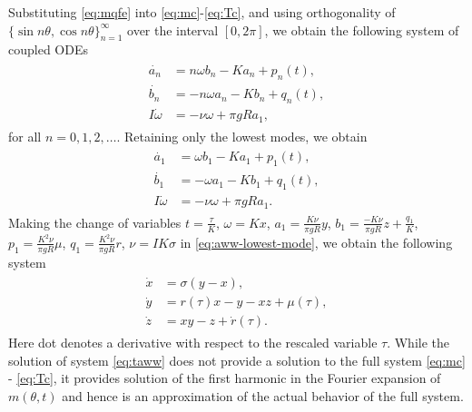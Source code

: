 Substituting \eqref{eq:mqfe} into \eqref{eq:mc}-\eqref{eq:Tc}, and using orthogonality of 
$\{\sin n\theta, \cos n\theta \}_{n=1}^\infty$ over the interval $[0,2\pi]$, we 
obtain the following system of coupled ODEs
\begin{align} \label{eq:aww-all-modes}
\begin{split}
\dot{a_n} &= n \omega b_n - Ka_n + p_n(t), \\
\dot{b_n} &= -n \omega a_n -Kb_n +q_n(t), \\
I\dot{\omega} &= -\nu \omega +\pi g R a_1,
\end{split}
\end{align}
for all $n=0,1,2,\ldots$. Retaining only the lowest modes, we obtain
\begin{align} \label{eq:aww-lowest-mode}
\begin{split}
\dot{a_1} &=  \omega b_1 - Ka_1 + p_1(t), \\
\dot{b_1} &= - \omega a_1 -Kb_1 +q_1(t), \\
I\dot{\omega} &= -\nu \omega +\pi g R a_1.
\end{split}
\end{align}
Making the change of variables $t =  \frac{\tau}{K}$, $\omega = Kx$, $a_1 = \frac{K\nu}{\pi g R}y$, $b_1 = \frac{-K \nu}{\pi g R}z +\frac{q_1}{K}$, $p_1 = \frac{K^2 \nu}{\pi g R}\mu$, $q_1 = \frac{K^2 \nu}{\pi g R}r$, $\nu = IK \sigma $ in \eqref{eq:aww-lowest-mode}, we obtain the following system
\begin{align} \label{eq:taww}
\begin{split}
\dot{x} &= \sigma (y-x), \\
\dot{y} &= r(\tau)x -y -xz +\mu(\tau), \\
\dot{z} &= xy -z +\dot{r}(\tau).
\end{split}
\end{align}
Here dot denotes a derivative with respect to the rescaled variable $\tau$. While the solution of system \eqref{eq:taww} does not provide a solution to the full system \eqref{eq:mc} - \eqref{eq:Tc}, it provides solution of the first harmonic 
in the Fourier expansion of $m(\theta,t)$ and hence is an approximation of the actual behavior of the full system.

